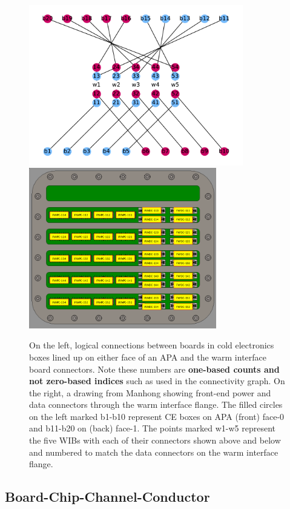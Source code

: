 \documentclass[pdftex,12pt,letter]{article}
\begin{document}
\begin{figure}[h]
  \centering
  \includegraphics[height=7cm]{test_plot_wib.pdf}%
  \includegraphics[height=7cm]{others/manhong-ce-mapping-wib.png}

  \caption{On the left, logical connections between boards in cold
    electronics boxes lined up on either face of an APA and the warm
    interface board connectors. Note these numbers are
    \textbf{one-based counts and not zero-based indices} such as used
    in the connectivity graph.  On the right, a drawing from Manhong
    showing front-end power and data connectors through the warm
    interface flange.  The filled circles on the left marked b1-b10
    represent CE boxes on APA (front) face-0 and b11-b20 on (back)
    face-1.  The points marked w1-w5 represent the five WIBs with each
    of their connectors shown above and below and numbered to match
    the data connectors on the warm interface flange.}
  \label{fig:wibflange}
\end{figure}

\subsection{Board-Chip-Channel-Conductor}
\end{document}
